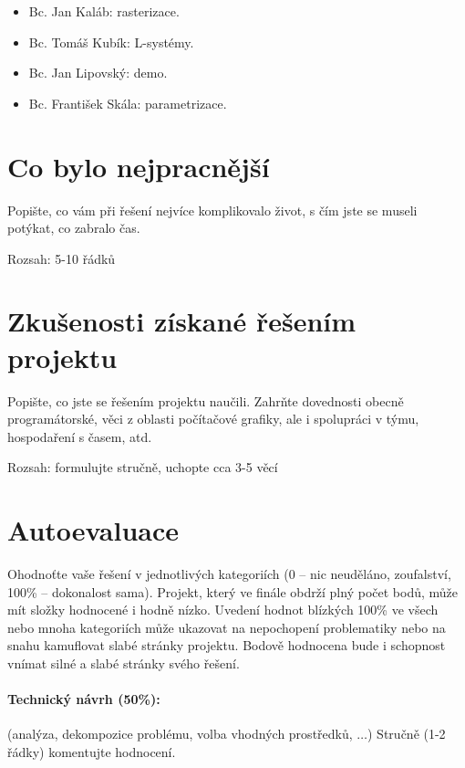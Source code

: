 \documentclass[11pt,a4paper]{article}
\begin{document}
\begin{itemize}
\item Bc. Jan Kaláb: rasterizace.
\item Bc. Tomáš Kubík: L-systémy.
\item Bc. Jan Lipovský: demo.
\item Bc. František Skála: parametrizace.
\end{itemize}

\section{Co bylo nejpracnější}

Popište, co vám při řešení nejvíce komplikovalo život, s čím jste se museli
potýkat, co zabralo čas.

Rozsah: 5-10 řádků

\section{Zkušenosti získané řešením projektu}

Popište, co jste se řešením projektu naučili. Zahrňte dovednosti obecně
programátorské, věci z oblasti počítačové grafiky, ale i spolupráci v týmu,
hospodaření s časem, atd.

Rozsah: formulujte stručně, uchopte cca 3-5 věcí

\section{Autoevaluace}

Ohodnoťte vaše řešení v jednotlivých kategoriích (0 – nic neuděláno,
zoufalství, 100\% – dokonalost sama). Projekt, který ve finále obdrží plný
počet bodů, může mít složky hodnocené i hodně nízko. Uvedení hodnot blízkých
100\% ve všech nebo mnoha kategoriích může ukazovat na nepochopení problematiky
nebo na snahu kamuflovat slabé stránky projektu. Bodově hodnocena bude i
schopnost vnímat silné a slabé stránky svého řešení.

\paragraph{Technický návrh (50\%):} (analýza, dekompozice problému, volba
vhodných prostředků, $\ldots$) 
Stručně (1-2 řádky) komentujte hodnocení. 
\end{document}
